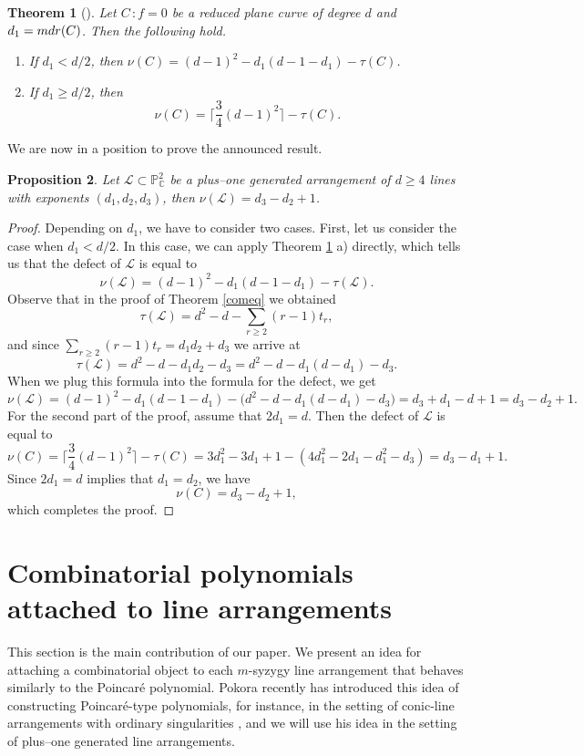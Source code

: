 \documentclass[12pt]{article}
\theoremstyle{plain}
\newtheorem{thm}{Theorem}[section]
\newtheorem{proposition}[thm]{Proposition}
\theoremstyle{definition}
\begin{document}
\begin{thm}[{\cite[Theorem 1.2]{Dimca1}}]
\label{deff}
Let $C \, : f=0$ be a reduced plane curve of degree $d$ and $d_{1}= {\rm mdr}(C)$. Then the following hold.
\begin{enumerate}
    \item[a)] If $d_{1} < d/2$, then $\nu(C) = (d-1)^{2}-d_{1}(d-1-d_{1})-\tau(C)$.
    \item[b)] If $d_{1} \geq d/2$, then
    $$\nu(C) = \bigg\lceil\frac{3}{4}(d-1)^{2}\bigg\rceil - \tau(C).$$
\end{enumerate}
\end{thm}
We are now in a position to prove the announced result.
\begin{proposition}
Let $\mathcal{L} \subset \mathbb{P}^{2}_{\mathbb{C}}$ be a plus--one generated arrangement of $d\geq 4$ lines with exponents $(d_{1},d_{2},d_{3})$, then $\nu(\mathcal{L}) = d_{3}-d_{2}+1$.
\end{proposition}
\begin{proof}
Depending on $d_1$, we have to consider two cases. First, let us consider the case when $d_1 < d/2$. In this case, we can apply Theorem \ref{deff} a) directly, which tells us that the defect of $\mathcal{L}$ is equal to
$$\nu(\mathcal{L}) = (d-1)^{2}-d_{1}(d-1-d_{1})-\tau(\mathcal{L}).$$
Observe that in the proof of Theorem \ref{comeq} we obtained 
$$\tau(\mathcal{L}) = d^{2}-d - \sum_{r\geq 2}(r-1)t_{r},$$
and since $\sum_{r\geq 2}(r-1)t_{r} = d_{1}d_{2}+d_{3}$ we arrive at
\begin{equation}
\tau(\mathcal{L}) = d^{2}-d - d_{1}d_{2} - d_{3} = d^{2}-d - d_{1}(d-d_{1})-d_{3}.
\end{equation}
When we plug this formula into the formula for the defect, we get
$$\nu(\mathcal{L}) =  (d-1)^{2}-d_{1}(d-1-d_{1}) -\bigg(d^{2}-d - d_{1}(d-d_{1})-d_{3}\bigg) = d_{3}+d_{1}-d+1 = d_{3}-d_{2}+1.$$
For the second part of the proof, assume that $2d_{1}=d$. Then the defect of $\mathcal{L}$ is equal to 
$$\nu(C) = \bigg\lceil\frac{3}{4}(d-1)^{2}\bigg\rceil - \tau(C) = 3d_{1}^{2}-3d_{1} + 1 - (4d_{1}^2-2d_{1}-d_{1}^2 - d_{3}) = d_{3}-d_{1}+1.$$
Since $2d_{1} = d$ implies that $d_{1}=d_{2}$, we have
$$\nu(C) = d_{3}-d_{2}+1,$$
which completes the proof.
\end{proof}
\section{Combinatorial polynomials attached to line arrangements}
This section is the main contribution of our paper. We present an idea for attaching a combinatorial object to each $m$-syzygy line arrangement that behaves similarly to the Poincar\'e polynomial. Pokora recently has introduced this idea of constructing Poincar\'e-type polynomials, for instance, in the setting of conic-line arrangements with ordinary singularities \cite{Pok}, and we will use his idea in the setting of plus--one generated line arrangements. 
\end{document}
